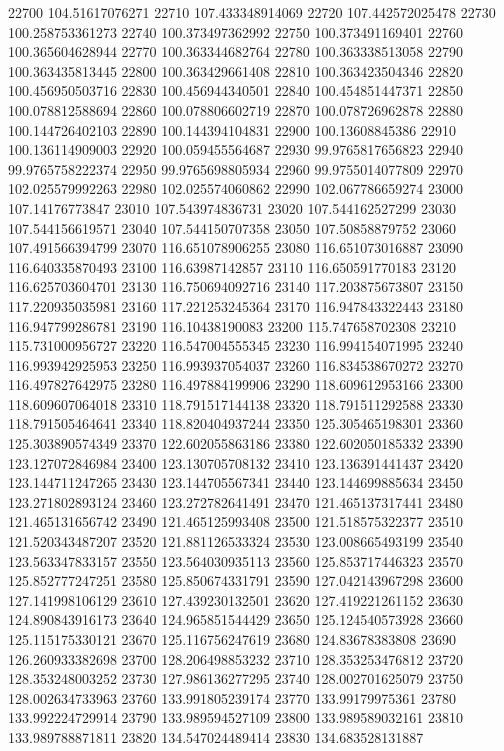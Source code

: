 {22700 104.51617076271
22710 107.433348914069
22720 107.442572025478
22730 100.258753361273
22740 100.373497362992
22750 100.373491169401
22760 100.365604628944
22770 100.363344682764
22780 100.363338513058
22790 100.363435813445
22800 100.363429661408
22810 100.363423504346
22820 100.456950503716
22830 100.456944340501
22840 100.454851447371
22850 100.078812588694
22860 100.078806602719
22870 100.078726962878
22880 100.144726402103
22890 100.144394104831
22900 100.13608845386
22910 100.136114909003
22920 100.059455564687
22930 99.9765817656823
22940 99.9765758222374
22950 99.9765698805934
22960 99.9755014077809
22970 102.025579992263
22980 102.025574060862
22990 102.067786659274
23000 107.14176773847
23010 107.543974836731
23020 107.544162527299
23030 107.544156619571
23040 107.544150707358
23050 107.50858879752
23060 107.491566394799
23070 116.651078906255
23080 116.651073016887
23090 116.640335870493
23100 116.63987142857
23110 116.650591770183
23120 116.625703604701
23130 116.750694092716
23140 117.203875673807
23150 117.220935035981
23160 117.221253245364
23170 116.947843322443
23180 116.947799286781
23190 116.10438190083
23200 115.747658702308
23210 115.731000956727
23220 116.547004555345
23230 116.994154071995
23240 116.993942925953
23250 116.993937054037
23260 116.834538670272
23270 116.497827642975
23280 116.497884199906
23290 118.609612953166
23300 118.609607064018
23310 118.791517144138
23320 118.791511292588
23330 118.791505464641
23340 118.820404937244
23350 125.305465198301
23360 125.303890574349
23370 122.602055863186
23380 122.602050185332
23390 123.127072846984
23400 123.130705708132
23410 123.136391441437
23420 123.144711247265
23430 123.144705567341
23440 123.144699885634
23450 123.271802893124
23460 123.272782641491
23470 121.465137317441
23480 121.465131656742
23490 121.465125993408
23500 121.518575322377
23510 121.520343487207
23520 121.881126533324
23530 123.008665493199
23540 123.563347833157
23550 123.564030935113
23560 125.853717446323
23570 125.852777247251
23580 125.850674331791
23590 127.042143967298
23600 127.141998106129
23610 127.439230132501
23620 127.419221261152
23630 124.890843916173
23640 124.965851544429
23650 125.124540573928
23660 125.115175330121
23670 125.116756247619
23680 124.83678383808
23690 126.260933382698
23700 128.206498853232
23710 128.353253476812
23720 128.353248003252
23730 127.986136277295
23740 128.002701625079
23750 128.002634733963
23760 133.991805239174
23770 133.99179975361
23780 133.992224729914
23790 133.989594527109
23800 133.989589032161
23810 133.989788871811
23820 134.547024489414
23830 134.683528131887
}
